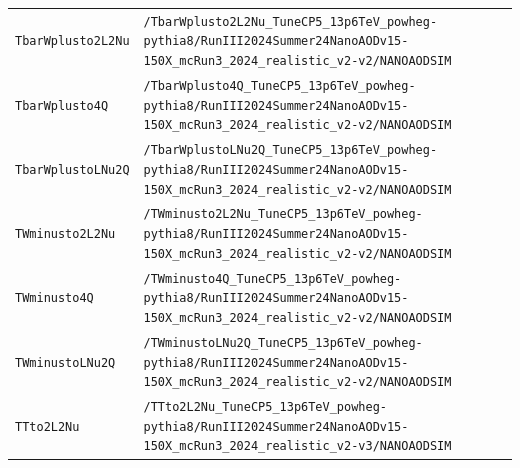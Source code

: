\begin{longtable}{@{}>{\RaggedRight\arraybackslash}p{} >{\RaggedRight\arraybackslash}p{}@{}}
\addlinespace[2pt]
\texttt{TbarWplusto2L2Nu} & \texttt{/\allowbreak{}TbarWplusto2L2Nu\_\allowbreak{}TuneCP5\_\allowbreak{}13p6TeV\_\allowbreak{}powheg-\allowbreak{}pythia8/\allowbreak{}RunIII2024Summer24NanoAODv15-\allowbreak{}150X\_\allowbreak{}mcRun3\_\allowbreak{}2024\_\allowbreak{}realistic\_\allowbreak{}v2-\allowbreak{}v2/\allowbreak{}NANOAODSIM} \\
\addlinespace[2pt]
\texttt{TbarWplusto4Q} & \texttt{/\allowbreak{}TbarWplusto4Q\_\allowbreak{}TuneCP5\_\allowbreak{}13p6TeV\_\allowbreak{}powheg-\allowbreak{}pythia8/\allowbreak{}RunIII2024Summer24NanoAODv15-\allowbreak{}150X\_\allowbreak{}mcRun3\_\allowbreak{}2024\_\allowbreak{}realistic\_\allowbreak{}v2-\allowbreak{}v2/\allowbreak{}NANOAODSIM} \\
\addlinespace[2pt]
\texttt{TbarWplustoLNu2Q} & \texttt{/\allowbreak{}TbarWplustoLNu2Q\_\allowbreak{}TuneCP5\_\allowbreak{}13p6TeV\_\allowbreak{}powheg-\allowbreak{}pythia8/\allowbreak{}RunIII2024Summer24NanoAODv15-\allowbreak{}150X\_\allowbreak{}mcRun3\_\allowbreak{}2024\_\allowbreak{}realistic\_\allowbreak{}v2-\allowbreak{}v2/\allowbreak{}NANOAODSIM} \\
\addlinespace[2pt]
\texttt{TWminusto2L2Nu} & \texttt{/\allowbreak{}TWminusto2L2Nu\_\allowbreak{}TuneCP5\_\allowbreak{}13p6TeV\_\allowbreak{}powheg-\allowbreak{}pythia8/\allowbreak{}RunIII2024Summer24NanoAODv15-\allowbreak{}150X\_\allowbreak{}mcRun3\_\allowbreak{}2024\_\allowbreak{}realistic\_\allowbreak{}v2-\allowbreak{}v2/\allowbreak{}NANOAODSIM} \\
\addlinespace[2pt]
\texttt{TWminusto4Q} & \texttt{/\allowbreak{}TWminusto4Q\_\allowbreak{}TuneCP5\_\allowbreak{}13p6TeV\_\allowbreak{}powheg-\allowbreak{}pythia8/\allowbreak{}RunIII2024Summer24NanoAODv15-\allowbreak{}150X\_\allowbreak{}mcRun3\_\allowbreak{}2024\_\allowbreak{}realistic\_\allowbreak{}v2-\allowbreak{}v2/\allowbreak{}NANOAODSIM} \\
\addlinespace[2pt]
\texttt{TWminustoLNu2Q} & \texttt{/\allowbreak{}TWminustoLNu2Q\_\allowbreak{}TuneCP5\_\allowbreak{}13p6TeV\_\allowbreak{}powheg-\allowbreak{}pythia8/\allowbreak{}RunIII2024Summer24NanoAODv15-\allowbreak{}150X\_\allowbreak{}mcRun3\_\allowbreak{}2024\_\allowbreak{}realistic\_\allowbreak{}v2-\allowbreak{}v2/\allowbreak{}NANOAODSIM} \\
\addlinespace[2pt]
\texttt{TTto2L2Nu} & \texttt{/\allowbreak{}TTto2L2Nu\_\allowbreak{}TuneCP5\_\allowbreak{}13p6TeV\_\allowbreak{}powheg-\allowbreak{}pythia8/\allowbreak{}RunIII2024Summer24NanoAODv15-\allowbreak{}150X\_\allowbreak{}mcRun3\_\allowbreak{}2024\_\allowbreak{}realistic\_\allowbreak{}v2-\allowbreak{}v3/\allowbreak{}NANOAODSIM} \\

\end{longtable}

